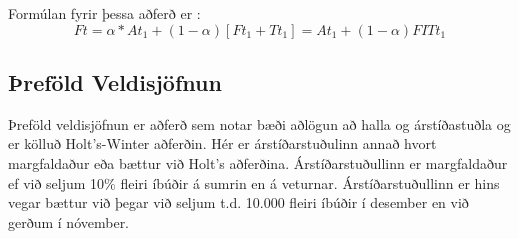 Formúlan fyrir þessa aðferð er : $$Ft = \alpha * At_1 + (1-\alpha) [Ft_1 + Tt_1] =  At_1 + (1-\alpha) FITt_1$$


\subsection{Þreföld Veldisjöfnun}
Þreföld veldisjöfnun er aðferð sem notar bæði aðlögun að halla og árstíðastuðla og er kölluð Holt’s-Winter aðferðin. Hér er árstíðarstuðulinn annað hvort margfaldaður eða bættur við Holt’s aðferðina.
Árstíðarstuðullinn er margfaldaður ef við seljum 10\% fleiri íbúðir á sumrin en á veturnar. Árstíðarstuðullinn er hins vegar bættur við þegar við seljum t.d. 10.000 fleiri íbúðir í desember en við gerðum í nóvember.
 



%
%

